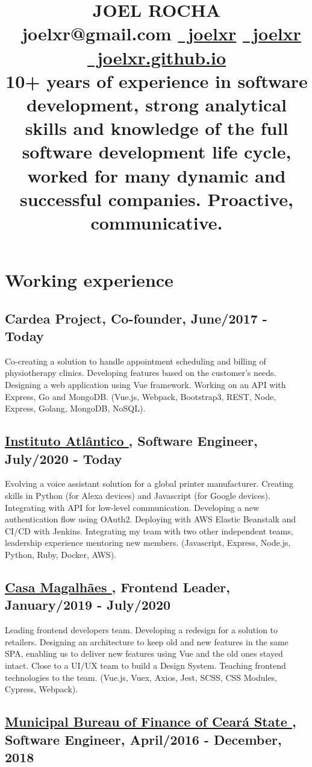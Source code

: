 \documentclass[10pt,a4paper]{article}
\title{
    \color{head} \huge \uppercase{Joel Rocha} \\
    \color{head} \vspace{0.2cm} \small \faEnvelopeO \ joelxr@gmail.com \href{https://github.com/joelxr}{\faGithub \ joelxr}
    \href{https://www.linkedin.com/in/joelxr}{\faLinkedin \ joelxr}
    \href{https://joelxr.github.io/}{\faGlobe \ joelxr.github.io}
    \\
    \color{black} \vspace{0.2cm} \small 10+ years of experience in software development, strong analytical skills and knowledge of the full software development life cycle, worked for many dynamic and successful companies. Proactive, communicative.
    \vspace{0.4cm} \hline
    \vspace{-0.8cm}
}
\author{}
\date{}
\begin{document}
\maketitle
\section*{Working experience}
\subsection*{Cardea Project, Co-founder, June/2017 - Today}

Co-creating a solution to handle appointment scheduling and billing of physiotherapy clinics. Developing features based on the customer's needs. Designing a web application using Vue framework. Working on an API with Express, Go and MongoDB. (Vue.js, Webpack, Bootstrap3, REST, Node, Express, Golang, MongoDB, NoSQL).

\subsection*{\href{www.atlantico.com.br}{\uline{Instituto Atlântico \faExternalLink}}, Software Engineer, July/2020 - Today}

Evolving a voice assistant solution for a global printer manufacturer. Creating skills in Python (for Alexa devices) and Javascript (for Google devices). Integrating with API for low-level communication. Developing a new authentication flow using OAuth2. Deploying with AWS Elastic Beanstalk and CI/CD with Jenkins. Integrating  my team with two other independent teams, leadership experience mentoring new members. (Javascript, Express, Node.js, Python, Ruby, Docker, AWS).

\subsection*{\href{www.casamagalhaes.com.br}{\uline{Casa Magalhães \faExternalLink}}, Frontend Leader, January/2019 - July/2020}

Leading frontend developers team. Developing a redesign for a solution to retailers. Designing an architecture to keep old and new features in the same SPA, enabling us to deliver new features using Vue and the old ones stayed intact. Close to a UI/UX team to build a Design System. Teaching frontend technologies to the team. (Vue.js, Vuex, Axios, Jest, SCSS, CSS Modules, Cypress, Webpack).

\subsection*{\href{https://www.sefin.fortaleza.ce.gov.br/}{\uline{Municipal Bureau of Finance of Ceará State \faExternalLink}}, Software Engineer, April/2016 - December, 2018}
\end{document}
